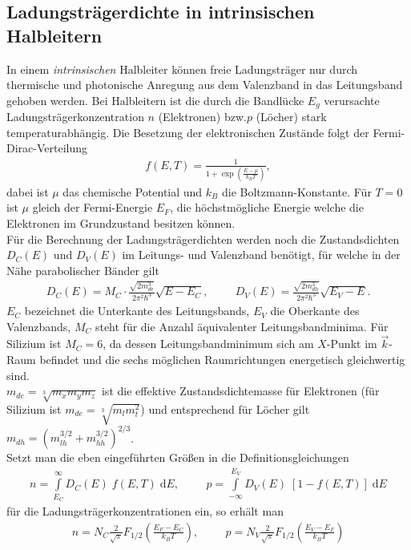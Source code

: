 \documentclass[a4paper,12pt]{article}
\begin{document}
\subsection{Ladungsträgerdichte in intrinsischen Halbleitern}
In einem \emph{intrinsischen} Halbleiter können freie Ladungsträger nur durch thermische und photonische Anregung aus dem Valenzband in das Leitungsband gehoben werden. Bei Halbleitern ist die durch die Bandlücke $E_g$ verursachte Ladungsträgerkonzentration $n$ (Elektronen) bzw.$p$ (Löcher) stark temperaturabhängig.
Die Besetzung der elektronischen Zustände folgt der Fermi-Dirac-Verteilung
\begin{align}
f(E,T)=\frac{1}{1+\exp\left(\frac{E-\mu}{k_B T}\right)},
\end{align}
dabei ist $\mu$ das chemische Potential und $k_B$ die Boltzmann-Konstante. Für $T=0$ ist $\mu$ gleich der Fermi-Energie $E_F$, die höchstmögliche Energie welche die Elektronen im Grundzustand besitzen können.\\
Für die Berechnung der Ladungsträgerdichten werden noch die Zustandsdichten $D_C(E)$ und $D_V(E)$ im Leitungs- und Valenzband benötigt, für welche in der Nähe parabolischer Bänder gilt
\begin{align}
D_C(E)=M_C\cdot \frac{\sqrt{2m_{de}^3}}{2\pi^2\hbar^3}\sqrt{E-E_C},\hspace{1cm}
D_V(E)=\frac{\sqrt{2m_{dh}^3}}{2\pi^2\hbar^3}\sqrt{E_V-E}.
\end{align}
$E_C$ bezeichnet die Unterkante des Leitungsbands, $E_V$ die Oberkante des Valenzbands, $M_C$ steht für die Anzahl äquivalenter Leitungsbandminima. Für Silizium ist $M_C=6$, da dessen Leitungsbandminimum sich am $X$-Punkt im $\vec{k}$-Raum befindet und die sechs möglichen Raumrichtungen energetisch gleichwertig sind.\\
$m_{de}=\sqrt[3]{m_x m_y m_z}$ ist die effektive Zustandsdichtemasse für Elektronen (für Silizium ist $m_{de}=\sqrt[3]{m_l m_t^2}$) und entsprechend für Löcher gilt $m_{dh}=(m_{lh}^{3/2}+m_{hh}^{3/2})^{2/3}$.\\
Setzt man die eben eingeführten Größen in die Definitionsgleichungen 
\begin{align}
n=\int\limits_{E_C}^\infty D_C(E)\;f(E,T)\;\mathrm{d}E,\hspace{1cm}
p=\int\limits_{-\infty}^{E_V} D_V(E)\;[1-f(E,T)]\;\mathrm{d}E
\end{align}
für die Ladungsträgerkonzentrationen ein, so erhält man
\begin{align}
n=N_C\frac{2}{\sqrt{\pi}}F_{1/2}\left(\frac{E_F-E_C}{k_B T}\right),\hspace{1cm}p=N_V\frac{2}{\sqrt{\pi}}F_{1/2}\left(\frac{E_V-E_F}{k_B T}\right)
\label{eq:density1}
\end{align}
\end{document}
